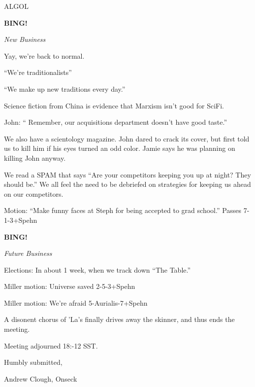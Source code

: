 \documentclass[12pt]{article}
\newcommand{\bing}{{\bf BING!} }
\newcommand{\goto}[1]{\bing \vskip 12pt \centerline{{\em{#1}}}}
\begin{document}
ALGOL

\goto{New Business}

Yay, we're back to normal.

``We're traditionalists''

``We make up new traditions every day.''

Science fiction from China is evidence that Marxism isn't good for SciFi.

John: `` Remember, our acquisitions department doesn't have good taste.''

We also have a scientology magazine.  John dared to crack its cover, but first told us to kill him if his eyes turned an odd color.  Jamie says he was planning on killing John anyway.

We read a SPAM that says ``Are your competitors keeping you up at night?  They should be.''  We all feel the need to be debriefed on strategies for keeping us ahead on our competitors.

Motion:  ``Make funny faces at Steph for being accepted to grad school.''  Passes 7-1-3+Spehn

\goto{Future Business}

Elections:  In about 1 week, when we track down ``The Table.''

Miller motion:  Universe saved 2-5-3+Spehn

Miller motion:  We're afraid  5-Aurialis-7+Spehn

A disonent chorus of 'La's finally drives away the skinner, and thus ends the meeting.

\vspace{12pt}

\noindent
Meeting adjourned 18:-12 SST.

\vspace{18pt}

\centerline{Humbly submitted,}
\centerline{Andrew Clough, Onseck}
\end{document}
